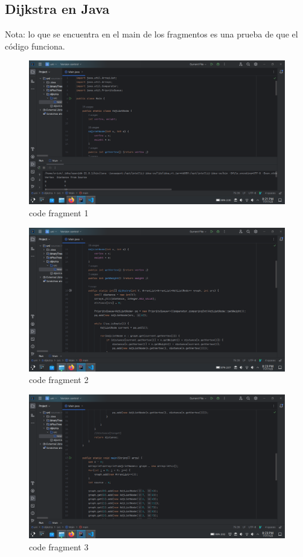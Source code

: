 \documentclass{article}
\begin{document}
\subsection*{Dijkstra en Java}
Nota: lo que se encuentra en el main de los fragmentos es una prueba de que el código funciona. 
\begin{figure}[H]
  \centering
  \includegraphics[scale=0.4]{../imgs/c.png}
  \caption{code fragment 1}
  \label{fig:1}
\end{figure}

\begin{figure}[H]
  \centering
  \includegraphics[scale=0.4]{../imgs/c1.png}
  \caption{code fragment 2}
  \label{fig:2}
\end{figure}

\begin{figure}[H]
  \centering
  \includegraphics[scale=0.4]{../imgs/c2.png}
  \caption{code fragment 3}
  \label{fig:3}
\end{figure}
\end{document}

